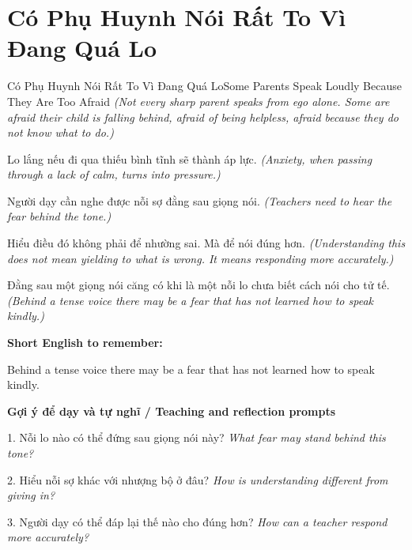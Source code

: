 \section{Có Phụ Huynh Nói Rất To Vì Đang Quá Lo}
\begin{truyen}{Có Phụ Huynh Nói Rất To Vì Đang Quá Lo}{Some Parents Speak Loudly Because They Are Too Afraid}
\textit{(Not every sharp parent speaks from ego alone. Some are afraid their child is falling behind, afraid of being helpless, afraid because they do not know what to do.)}

Lo lắng nếu đi qua thiếu bình tĩnh sẽ thành áp lực.
\textit{(Anxiety, when passing through a lack of calm, turns into pressure.)}

Người dạy cần nghe được nỗi sợ đằng sau giọng nói.
\textit{(Teachers need to hear the fear behind the tone.)}

Hiểu điều đó không phải để nhường sai. Mà để nói đúng hơn.
\textit{(Understanding this does not mean yielding to what is wrong. It means responding more accurately.)}

\end{truyen}

\begin{baihoc}
Đằng sau một giọng nói căng có khi là một nỗi lo chưa biết cách nói cho tử tế.
\textit{(Behind a tense voice there may be a fear that has not learned how to speak kindly.)}
\end{baihoc}

\begin{ghinhoanh}
\textbf{Short English to remember:}

Behind a tense voice there may be a fear that has not learned how to speak kindly.

\end{ghinhoanh}

\begin{tuhocnhanh}
\textbf{Gợi ý để dạy và tự nghĩ / Teaching and reflection prompts}

1. Nỗi lo nào có thể đứng sau giọng nói này? \textit{What fear may stand behind this tone?}

2. Hiểu nỗi sợ khác với nhượng bộ ở đâu? \textit{How is understanding different from giving in?}

3. Người dạy có thể đáp lại thế nào cho đúng hơn? \textit{How can a teacher respond more accurately?}
\end{tuhocnhanh}
\ngancach

